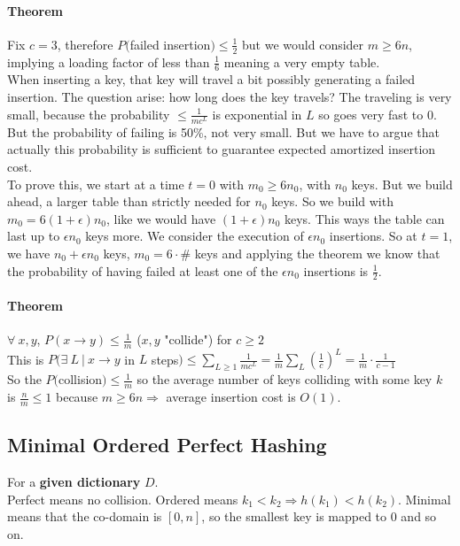 \documentclass[10pt]{report}
\begin{document}
\paragraph{Theorem} Fix $c=3$, therefore $P($failed insertion$)\leq \frac{1}{2}$ but we would consider $m\geq 6n$, implying a loading factor of less than $\frac{1}{6}$ meaning a very empty table.\\
When inserting a key, that key will travel a bit possibly generating a failed insertion. The question arise: how long does the key travels? The traveling is very small, because the probability $\leq \frac{1}{mc^L}$ is exponential in $L$ so goes very fast to 0. But the probability of failing is 50\%, not very small. But we have to argue that actually this probability is sufficient to guarantee expected amortized insertion cost.\\
To prove this, we start at a time $t=0$ with $m_0\geq 6n_0$, with $n_0$ keys. But we build ahead, a larger table than strictly needed for $n_0$ keys. So we build with $m_0 = 6(1+\epsilon)n_0$, like we would have $(1+\epsilon)n_0$ keys. This ways the table can last up to $\epsilon n_0$ keys more. We consider the execution of $\epsilon n_0$ insertions. So at $t=1$, we have $n_0 + \epsilon n_0$ keys, $m_0 = 6\cdot\#$ keys and applying the theorem we know that the probability of having failed at least one of the $\epsilon n_0$ insertions is $\frac{1}{2}$.
\paragraph{Theorem} $\forall\:x,y$, $P(x\rightarrow y)\leq\frac{1}{m}$ ($x,y$ "collide") for $c\geq 2$\\
This is $P(\exists\:L\:|\:x\rightarrow y$ in $L$ steps$)\leq \sum_{L\geq1} \frac{1}{mc^L}=\frac{1}{m}\sum_L \left(\frac{1}{c}\right)^L = \frac{1}{m}\cdot\frac{1}{c-1}$\\
So the $P($collision$)\leq \frac{1}{m}$ so the average number of keys colliding with some key $k$ is $\frac{n}{m}\leq 1$ because $m\geq 6n \Rightarrow$ average insertion cost is $O(1)$.
\subsection{Minimal Ordered Perfect Hashing} For a \textbf{given dictionary} $D$.\\
Perfect means no collision. Ordered means $k_1<k_2\Rightarrow h(k_1)<h(k_2)$. Minimal means that the co-domain is $[0,n]$, so the smallest key is mapped to 0 and so on.\\
\end{document}

